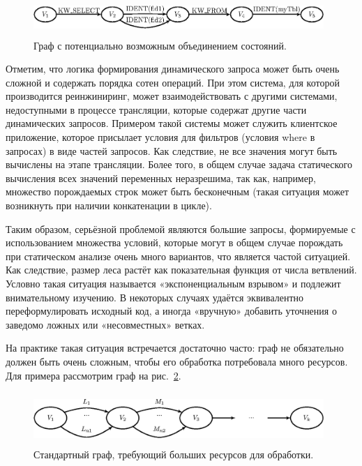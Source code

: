 \documentclass{llncs}
\begin{document}
\begin{figure}
    \begin{center}
        \includegraphics[width=11cm,height=1.4cm]{graphs/states_example.eps}
        \caption{Граф с потенциально возможным объединением состояний.}
        \label{pic4}
    \end{center}
\end{figure}

Отметим, что логика формирования динамического запроса может быть очень сложной и содержать порядка сотен операций. При этом система, для которой производится реинжиниринг, может взаимодействовать с другими системами, недоступными в процессе трансляции, которые содержат другие части динамических запросов. Примером такой системы может служить клиентское приложение, которое присылает условия для фильтров (условия where в запросах) в виде частей запросов. Как следствие, не все значения могут быть вычислены на этапе трансляции. Более того, в общем случае задача статического вычисления всех значений переменных неразрешима, так как, например, множество порождаемых строк может быть бесконечным (такая ситуация может возникнуть при наличии конкатенации в цикле).

Таким образом, серьёзной проблемой являются большие запросы, формируемые с использованием множества условий, которые могут в общем случае порождать при статическом анализе очень много вариантов, что является частой ситуацией. Как следствие, размер леса растёт как показательная функция от числа ветвлений. Условно такая ситуация называется «экспоненциальным взрывом» и подлежит внимательному изучению. В некоторых случаях удаётся эквивалентно переформулировать исходный код, а иногда «вручную» добавить уточнения о заведомо ложных или «несовместных» ветках.

На практике такая ситуация встречается достаточно часто: граф не обязательно должен быть очень сложным, чтобы его обработка потребовала много ресурсов. Для примера рассмотрим граф  на рис.~\ref{pic5}.

\begin{figure}
    \begin{center}
        \includegraphics[width=11cm,height=2cm]{graphs/big_res.eps}
        \caption{Стандартный граф, требующий больших ресурсов для обработки.}
        \label{pic5}
    \end{center}
\end{figure}
\end{document}
